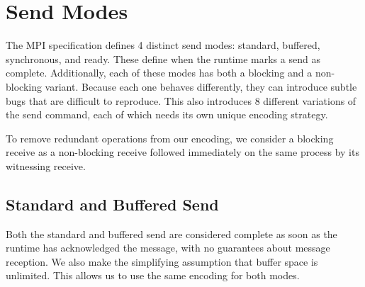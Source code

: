 \section{Send Modes}

The MPI specification defines 4 distinct send modes: standard, buffered,
synchronous, and ready. These define when the runtime marks a send as complete.
Additionally, each of these modes has both a blocking and a non-blocking
variant.
Because each one behaves differently, they can introduce subtle bugs that
are difficult to reproduce. 
This also introduces 8 different variations of the send command, each of which
needs its own unique encoding strategy.

To remove redundant operations from our encoding, we consider a blocking receive
as a non-blocking receive followed immediately on the same process by its
witnessing receive.

\subsection{Standard and Buffered Send}
Both the standard and buffered send are considered complete as soon as the
runtime has acknowledged the message, with no guarantees about message
reception. We also make the simplifying assumption that buffer space is
unlimited. This allows us to use the same encoding for both modes.

